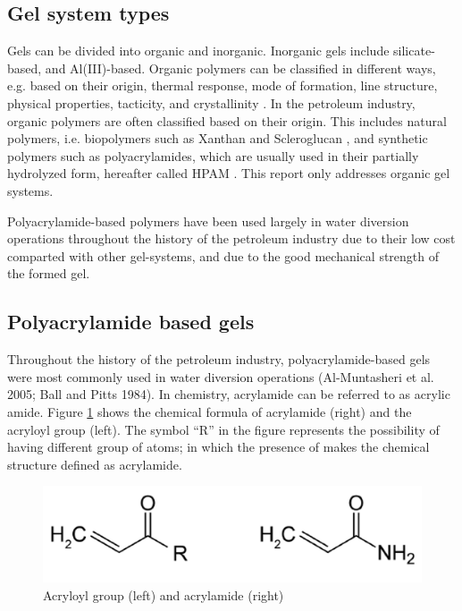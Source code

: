 \subsection{Gel system types}

Gels can be divided into organic and inorganic. Inorganic gels include silicate-based, and Al(III)-based. Organic polymers can be classified in different ways, e.g. based on their origin, thermal response, mode of formation, line structure, physical properties, tacticity, and crystallinity \citep{Ghosh2006}. In the petroleum industry, organic polymers are often classified based on their origin. This includes natural polymers, i.e. biopolymers such as Xanthan and Scleroglucan \citep{Al-Muntasheri2012}, and synthetic polymers such as polyacrylamides, which are usually used in their partially hydrolyzed form, hereafter called  HPAM \citep{Finch1992}. This report only addresses organic gel systems.

Polyacrylamide-based polymers have been used largely in water diversion operations throughout the history of the petroleum industry due to their low cost comparted with other gel-systems, and due to the good mechanical strength of the formed gel. 

\subsection{Polyacrylamide based gels \label{sec:PolyacrylamideGels}} 
Throughout the history of the petroleum industry, polyacrylamide-based gels were most commonly used in water diversion operations \citep{Al-Muntasheri2005, Ball1984} (Al-Muntasheri et al. 2005; Ball and Pitts 1984). In chemistry, acrylamide can be referred to as acrylic amide. Figure \ref{fig:acrylamide} shows the chemical formula of acrylamide (right) and the acryloyl group (left). The symbol “R” in the figure represents the possibility of having different group of atoms; in which the presence of  makes the chemical structure defined as acrylamide.

\begin{figure}
    \centering
    \includegraphics[width=\textwidth]{img/fig/acrylamide.png}
    \caption{Acryloyl group (left) and acrylamide (right)}
    \label{fig:acrylamide} %
\end{figure}

